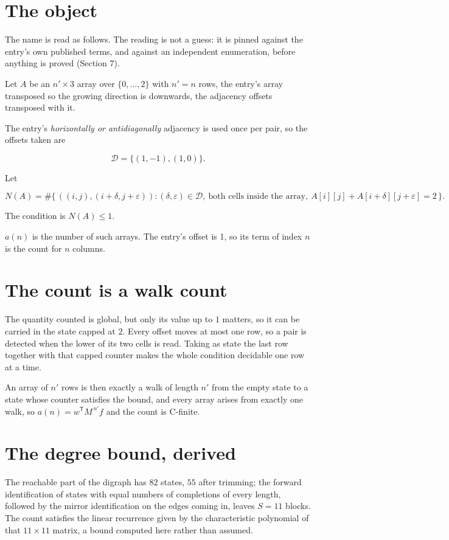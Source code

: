 \documentclass[11pt]{article}
\theoremstyle{definition}
\begin{document}
\section{The object}

The name is read as follows. The reading is not a guess: it is pinned against the entry's own published terms, and against an independent enumeration, before anything is proved (Section 7).

Let $A$ be an $n' \times 3$ array over $\{0,\dots,2\}$ with $n' = n$ rows, the entry's array transposed so the growing direction is downwards, the adjacency offsets transposed with it.

The entry's {\itshape horizontally or antidiagonally} adjacency is used once per pair, so the offsets taken are

\[\mathcal{D} = \{(1,-1), (1,0)\}.\]

Let

\[N(A) = \#\bigl\{\,((i,j),(i{+}\delta,j{+}\varepsilon)) : (\delta,\varepsilon) \in \mathcal{D},\ \text{both cells inside the array},\ A[i][j] + A[i{+}\delta][j{+}\varepsilon] = 2\,\bigr\}.\]

The condition is $N(A) \le 1$.

$a(n)$ is the number of such arrays. The entry's offset is 1, so its term of index $n$ is the count for $n$ columns.

\section{The count is a walk count}

The quantity counted is global, but only its value up to $1$ matters, so it can be carried in the state capped at $2$. Every offset moves at most one row, so a pair is detected when the lower of its two cells is read. Taking as state the last row together with that capped counter makes the whole condition decidable one row at a time.

An array of $n'$ rows is then exactly a walk of length $n'$ from the empty state to a state whose counter satisfies the bound, and every array arises from exactly one walk, so $a(n) = w^{\mathsf T}M^{\,n'}f$ and the count is C-finite.

\section{The degree bound, derived}

The reachable part of the digraph has $82$ states, $55$ after trimming; the forward identification of states with equal numbers of completions of every length, followed by the mirror identification on the edges coming in, leaves $S = 11$ blocks. The count satisfies the linear recurrence given by the characteristic polynomial of that $11\times11$ matrix, a bound computed here rather than assumed.
\end{document}

